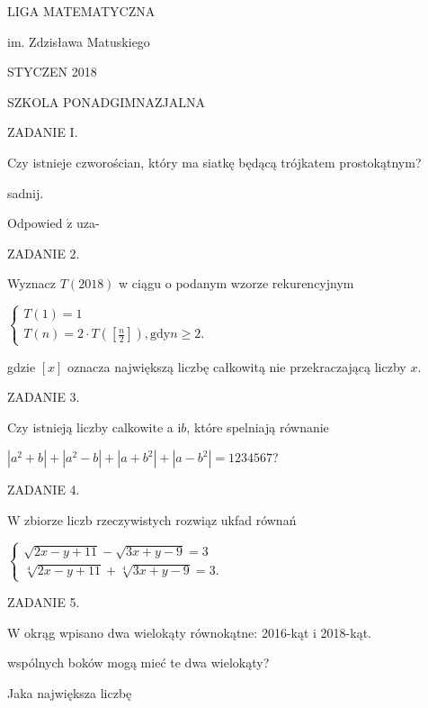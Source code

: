 \documentclass[a4paper,12pt]{article}
\begin{document}
LIGA MATEMATYCZNA

im. Zdzisława Matuskiego

STYCZEN 2018

SZKOLA PONADGIMNAZJALNA

ZADANIE I.

Czy istnieje czworościan, który ma siatkę będącą trójkatem prostokątnym?

sadnij.

Odpowied $\acute{\mathrm{z}}$ uza-

ZADANIE 2.

Wyznacz $T(2018)$ w ciągu o podanym wzorze rekurencyjnym

$\left\{\begin{array}{l}
T(1)=1\\
T(n)=2\cdot T([\frac{n}{2}]),\mathrm{g}\mathrm{d}\mathrm{y}n\geq 2.
\end{array}\right.$

gdzie $[x]$ oznacza największą liczbę całkowitą nie przekraczającą liczby $x.$

ZADANIE 3.

Czy istnieją liczby calkowite a $\mathrm{i}b$, które spelniają równanie

$|a^{2}+b|+|a^{2}-b|+|a+b^{2}|+|a-b^{2}|=1234567$?

ZADANIE 4.

$\mathrm{W}$ zbiorze liczb rzeczywistych rozwiąz ukfad równań

$\left\{\begin{array}{l}
\sqrt{2x-y+11}-\sqrt{3x+y-9}=3\\
\sqrt[4]{2x-y+11}+\sqrt[4]{3x+y-9}=3.
\end{array}\right.$

ZADANIE 5.

W okrąg wpisano dwa wielokąty równokątne: 2016-kąt i 2018-kąt.

wspólnych boków mogą mieć te dwa wielokąty?

Jaka największa liczbę
\end{document}
